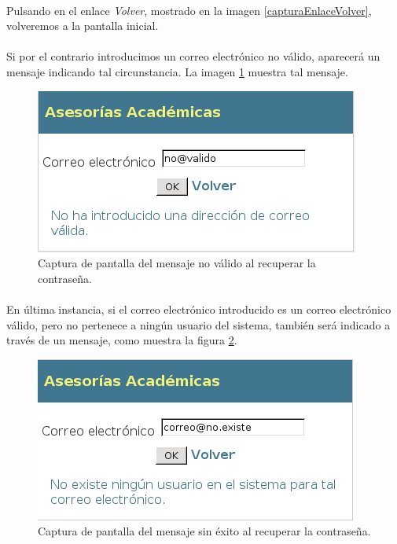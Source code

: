   \paragraph{}Pulsando en el enlace \textit{Volver}, mostrado en la imagen
  \ref{capturaEnlaceVolver}, volveremos a la pantalla inicial.

  \paragraph{}Si por el contrario introducimos un correo electrónico no válido,
  aparecerá un mensaje indicando tal circunstancia. La imagen
  \ref{capturaPedirCorreoInvalido} muestra tal mensaje.

  \begin{figure}[!ht]
    \begin{center}
      \includegraphics[scale=0.6]{4.Funcionamiento_Aplicacion/4.2.Acceso_Sistema/4.2.1.Recordar_Password/Capturas/pedir_correo_invalido.png}
      \caption{Captura de pantalla del mensaje no válido al recuperar la contraseña.}
      \label{capturaPedirCorreoInvalido}
    \end{center}
  \end{figure}

  \paragraph{}En última instancia, si el correo electrónico introducido es un
  correo electrónico válido, pero no pertenece a ningún usuario del sistema,
  también será indicado a través de un mensaje, como muestra la figura
  \ref{capturaPedirCorreoNoExito}.

  \begin{figure}[!ht]
    \begin{center}
      \includegraphics[scale=0.6]{4.Funcionamiento_Aplicacion/4.2.Acceso_Sistema/4.2.1.Recordar_Password/Capturas/pedir_correo_noexito.png}
      \caption{Captura de pantalla del mensaje sin éxito al recuperar la contraseña.}
      \label{capturaPedirCorreoNoExito}
    \end{center}
  \end{figure}
